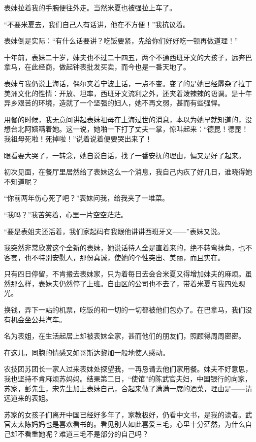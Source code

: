 \par 表妹拉着我的手腕便往外走。当然米夏也被强拉上车了。
\par “不要米夏去，我们自己人有话讲，他在不方便！”我抗议着。
\par 表妹倒是实际：“有什么话要讲？吃饭要紧，先给你们好好吃一顿再做道理！”
\par 十年前，表妹二十岁，妹夫也不过二十四五，两个不通西班牙文的大孩子，远奔巴拿马，在此经商，做起钟表批发买卖，而今也是一番天地了。
\par 表妹与我仍说上海话，偶尔夹着宁波土话，一点不变。变了的是她已经羼杂了拉丁美洲文化的性情：开放、坦率，西班牙文流利之外，还夹着泼辣辣的语调。是十年异乡艰苦的环境，造就了一个坚强的妇人，她不再文弱，甚而有些强悍。
\par 用餐的时候，我无意间讲起表妹祖母在上海过世的消息，本以为她早就知道的，没想台北阿姨瞒着她。这一说，她啪一下打了丈夫一掌，惊叫起来：“德昆！德昆！我祖母死啦！死掉啦！”说着说着便要哭出来了！
\par 眼看要大哭了，一转念，她自说自话，找了一番安抚的理由，偏又是好了起来。
\par 初次见面，在餐厅里居然给了表妹这么一个消息，我自己内疚了好几日，谁晓得她不知道呢？
\par “你前两年伤心死了吧？”表妹问我，给我夹了一堆菜。
\par “我吗？”我苦笑着，心里一片空空茫茫。
\par “要是表姐夫还活着，我们家起码有我跟他讲讲西班牙文——”表妹又说。
\par 我突然非常欣赏这个全新的表妹，她说话待人全是直着来的，绝不转弯抹角，也不客套，也不特别安慰人，那份真诚，使她的个性突出、美丽，而且实在。
\par 只有四日停留，不肯搬去表妹家，只为着每日去会合米夏又得增加妹夫的麻烦。虽然那么样，表妹夫仍然停了上班。自由区的公司也不去了，带着米夏与我四处观光。
\par 换钱，弄下一站的机票，吃饭的和一切的一切都被他们包办了。在巴拿马，我们没有机会坐公共汽车。
\par 名为表姐，在生活起居上却被表妹全家，甚而他们的朋友们，照顾得周周密密。
\par 在这儿，同胞的情感又如哥斯达黎加一般地使人感动。
\par 农技团苏团长一家人过来表妹处探望我，一再恳请去他们家用餐。妹夫不好意思，我也坚持不肯麻烦苏妈妈。结果第二日，“使馆”的陈武官夫妇，中国银行的向家，苏家，彭先生，宋先生加上表妹自己，合起来做了满满一席的酒菜，理由是——请远道来的表姐。
\par 苏家的女孩子们离开中国已经好多年了，家教极好，仍看中文书，是我的读者。武官太太陈妈妈也是喜欢看书的。看见别人如此喜爱三毛，心里十分茫然，为什么自己却不看重她呢？难道三毛不是部分的自己吗？
